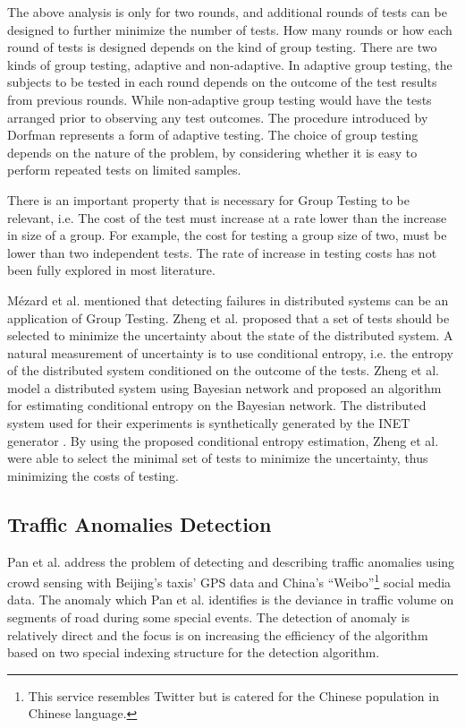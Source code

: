\documentclass{sig-alternate}
\begin{document}
The above analysis is only for two rounds, and additional rounds of tests can be designed to further minimize the number of tests. How many rounds or how each round of tests is designed depends on the kind of group testing. There are two kinds of group testing, adaptive and non-adaptive. In adaptive group testing, the subjects to be tested in each round depends on the outcome of the test results from previous rounds. While non-adaptive group testing would have the tests arranged prior to observing any test outcomes. The procedure introduced by Dorfman \cite{Dorfman1943} represents a form of adaptive testing. The choice of group testing depends on the nature of the problem, by considering whether it is easy to perform repeated tests on limited samples.

There is an important property that is necessary for Group Testing to be relevant, i.e. The cost of the test must increase at a rate lower than the increase in size of a group. For example, the cost for testing a group size of two, must be lower than two independent tests. The rate of increase in testing costs has not been fully explored in most literature.

M\'{e}zard et al. \cite{Mezard2008} mentioned that detecting failures in distributed systems \cite{Zheng2004,Zheng2005} can be an application of Group Testing. Zheng et al. \cite{Zheng2004,Zheng2005} proposed that a set of tests should be selected to minimize the uncertainty about the state of the distributed system. A natural measurement of uncertainty is to use conditional entropy, i.e. the entropy of the distributed system conditioned on the outcome of the tests. Zheng et al. \cite{Zheng2004,Zheng2005} model a distributed system using Bayesian network and proposed an algorithm for estimating conditional entropy on the Bayesian network. The distributed system used for their experiments is synthetically generated by the INET generator \cite{Winick2002}. By using the proposed conditional entropy estimation, Zheng et al. \cite{Zheng2004,Zheng2005} were able to select the minimal set of tests to minimize the uncertainty, thus minimizing the costs of testing.

\subsection{Traffic Anomalies Detection}

Pan et al. \cite{Pan2013} address the problem of detecting and describing traffic anomalies using crowd sensing with Beijing's taxis' GPS data and China's ``Weibo''\footnote{This service resembles Twitter but is catered for the Chinese population in Chinese language.} social media data. The anomaly which Pan et al. \cite{Pan2013} identifies is the deviance in traffic volume on segments of road during some special events. The detection of anomaly is relatively direct and the focus is on increasing the efficiency of the algorithm based on two special indexing structure for the detection algorithm.
\end{document}
